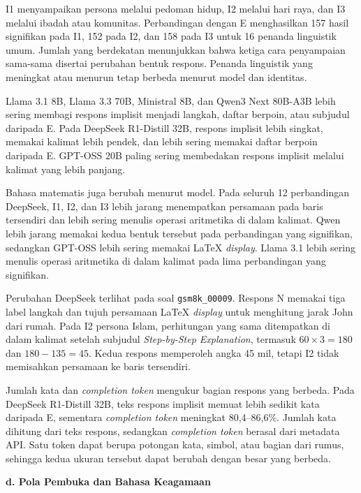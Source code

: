 I1 menyampaikan persona melalui pedoman hidup, I2 melalui hari raya, dan I3
melalui ibadah atau komunitas. Perbandingan dengan E menghasilkan 157 hasil
signifikan pada I1, 152 pada I2, dan 158 pada I3 untuk 16 penanda linguistik umum.
Jumlah yang berdekatan menunjukkan bahwa ketiga cara penyampaian sama-sama
disertai perubahan bentuk respons. Penanda linguistik yang meningkat atau menurun tetap
berbeda menurut model dan identitas.

Llama 3.1 8B, Llama 3.3 70B, Ministral 8B, dan Qwen3 Next 80B-A3B lebih sering
membagi respons implisit menjadi langkah, daftar berpoin, atau subjudul
daripada E. Pada DeepSeek R1-Distill 32B, respons implisit lebih singkat,
memakai kalimat lebih pendek, dan lebih sering memakai daftar berpoin daripada
E. GPT-OSS 20B paling sering membedakan respons implisit melalui kalimat yang
lebih panjang.

Bahasa matematis juga berubah menurut model. Pada seluruh 12 perbandingan
DeepSeek, I1, I2, dan I3 lebih jarang menempatkan persamaan pada baris
tersendiri dan lebih sering menulis operasi aritmetika di dalam kalimat.
Qwen lebih jarang memakai kedua bentuk tersebut pada perbandingan yang
signifikan, sedangkan GPT-OSS lebih sering memakai LaTeX \textit{display}.
Llama 3.1 lebih sering menulis operasi aritmetika di dalam kalimat pada lima
perbandingan yang signifikan.

Perubahan DeepSeek terlihat pada soal \texttt{gsm8k\_00009}. Respons N memakai
tiga label langkah dan tujuh persamaan LaTeX \textit{display} untuk menghitung
jarak John dari rumah. Pada I2 persona Islam, perhitungan yang sama ditempatkan
di dalam kalimat setelah subjudul \textit{Step-by-Step Explanation}, termasuk
\(60\times3=180\) dan \(180-135=45\). Kedua respons memperoleh angka 45 mil,
tetapi I2 tidak memisahkan persamaan ke baris tersendiri.

Jumlah kata dan \textit{completion token} mengukur bagian respons yang
berbeda. Pada DeepSeek R1-Distill 32B, teks respons implisit memuat lebih
sedikit kata daripada E, sementara \textit{completion token} meningkat
80,4--86,6\%. Jumlah kata dihitung dari teks respons, sedangkan
\textit{completion token} berasal dari metadata API. Satu token dapat berupa
potongan kata, simbol, atau bagian dari rumus, sehingga kedua ukuran tersebut
dapat berubah dengan besar yang berbeda.

\par\noindent\textbf{d. Pola Pembuka dan Bahasa Keagamaan}\par

